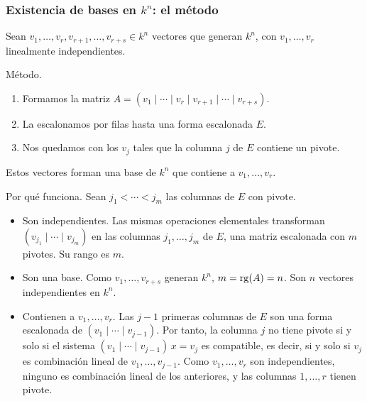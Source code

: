 \begin{frame}[allowframebreaks,t]
    \frametitle{Existencia de bases en \(k^n\): el método}

    Sean \(v_1,\ldots,v_r,v_{r+1},\ldots,v_{r+s}\in k^n\) vectores que
    generan \(k^n\), con \(v_1,\ldots,v_r\) linealmente independientes.

    \medskip

    \alert{Método.}
    \begin{enumerate}
        \item Formamos la matriz
              \(A=(v_1\mid\cdots\mid v_r\mid v_{r+1}\mid\cdots\mid v_{r+s})\).
        \item La escalonamos por filas hasta una forma escalonada \(E\).
        \item Nos quedamos con los \(v_j\) tales que la columna \(j\) de
              \(E\) contiene un pivote.
    \end{enumerate}
    Estos vectores forman una base de \(k^n\) que contiene a
    \(v_1,\ldots,v_r\).

    \framebreak

    \alert{Por qué funciona.} Sean \(j_1<\cdots<j_m\) las columnas de
    \(E\) con pivote.
    \begin{itemize}
        \item \alert{Son independientes.} Las mismas operaciones
              elementales transforman \((v_{j_1}\mid\cdots\mid v_{j_m})\) en
              las columnas \(j_1,\ldots,j_m\) de \(E\), una matriz
              escalonada con \(m\) pivotes. Su rango es \(m\).
        \item \alert{Son una base.} Como \(v_1,\ldots,v_{r+s}\) generan
              \(k^n\), \(m=\operatorname{rg}(A)=n\). Son \(n\) vectores independientes
              en \(k^n\).
        \item \alert{Contienen a \(v_1,\ldots,v_r\).} Las \(j-1\) primeras
              columnas de \(E\) son una forma escalonada de
              \((v_1\mid\cdots\mid v_{j-1})\). Por tanto, la columna \(j\)
              no tiene pivote si y solo si el sistema
              \((v_1\mid\cdots\mid v_{j-1})\,x=v_j\) es compatible, es decir,
              si y solo si \(v_j\) es combinación lineal de
              \(v_1,\ldots,v_{j-1}\). Como \(v_1,\ldots,v_r\) son
              independientes, ninguno es combinación lineal de los
              anteriores, y las columnas \(1,\ldots,r\) tienen pivote.
    \end{itemize}
\end{frame}


